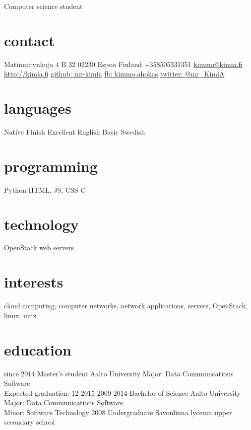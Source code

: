 \documentclass[]{friggeri-cv}
\begin{document}
       {Computer science student}


\begin{aside}
  \section{contact}
    Matinniitynkuja 4 B 32
    02230 Espoo
    Finland
    +358505331351
    \href{mailto:kimmo@kimia.fi}{kimmo@kimia.fi}
    ~
    \href{http://kimia.fi}{http://kimia.fi}
    \href{https://github.com/mr-kimia}{github: mr-kimia}
    \href{https://www.facebook.com/kimmo.ahokas}{fb: kimmo.ahokas}
    \href{https://twitter.com/mr_KimiA}{twitter: @mr\_KimiA}
  \section{languages}
    Native Finish
    Excellent English
    Basic Swedish
  \section{programming}
    Python
    HTML, JS, CSS
    C
  \section{technology}
    OpenStack
    web servers
\end{aside}

\section{interests}

cloud computing, computer networks, network applications, servers, OpenStack,
linux, unix

\section{education}

\begin{entrylist}
  \entry
    {since 2014}
    {Master's student}
    {Aalto University}
    {Major: Data Communications Software\\
    Expected graduation: 12 2015}
  \entry
    {2009-2014}
    {Bachelor of Science}
    {Aalto University}
    {Major: Data Communications Software\\
    Minor: Software Technology}
  \entry
    {2008}
    {Undergraduate}
    {Savonlinna lyceum upper secondary school}
    {}
\end{entrylist}
\end{document}
